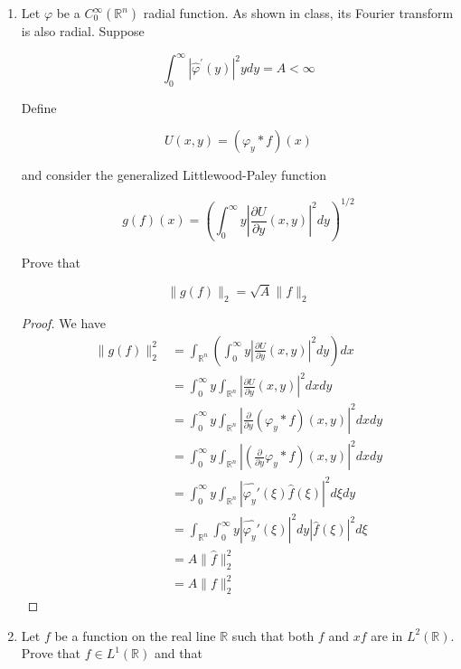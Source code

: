 \begin{enumerate}
\begin{proof}
	where
	\begin{align*}
		\int_0^{\infty} y \hat{P}_{2y} (\xi) d y
		&= \int_0^{\infty} y e^{-2 \pi (2 y) |\xi|} dy \\
		&= \frac{1}{16 \pi^2 |\xi|^2}
	\end{align*}
\end{proof}

\item Let $\varphi$ be a $C_0^{\infty}\left(\mathbb{R}^n\right)$ radial function. As shown in class, its Fourier transform is also radial. Suppose

\[
\int_0^{\infty}\left|\hat{\varphi}^{\prime}(y)\right|^2 y d y=A<\infty
\]


Define

\[
U(x, y)=\left(\varphi_y * f\right)(x)
\]

and consider the generalized Littlewood-Paley function

\[
g(f)(x)=\left(\int_0^{\infty} y\left|\frac{\partial U}{\partial y}(x, y)\right|^2 d y\right)^{1 / 2}
\]


Prove that

\[
\|g(f)\|_2=\sqrt{A}\|f\|_2
\]

\begin{proof}
	We have
	\begin{align*}
		\|g(f)\|_2^2
		&= \int _{\mathbb{R}^n} \left( \int _0^\infty y \left| \frac{\partial U}{\partial y} (x, y) \right| ^2 dy \right) dx \\
		&= \int_0 ^\infty y \int _{\mathbb{R}^n} \left| \frac{\partial U}{\partial y} (x, y) \right| ^2 dx dy \\
		&= \int _0^\infty y \int _{\mathbb{R}^n} \left| \frac{\partial}{\partial y} \left( \varphi_y * f \right) (x, y) \right| ^2 dx dy \\
		&= \int _0^\infty y \int _{\mathbb{R}^n} \left| \left( \frac{\partial}{\partial y} \varphi_y * f \right) (x, y) \right| ^2 dx dy \\
		&= \int _0^\infty y \int _{\mathbb{R}^n} \left| \widehat{\varphi_y'}(\xi) \hat{f}(\xi) \right| ^2 d \xi dy \\
		&= \int _{\mathbb{R}^n} \int _0^\infty y \left| \widehat{\varphi_y'}(\xi) \right| ^2 d y \left| \hat{f}(\xi) \right| ^2 d \xi \\	
		&= A \| \hat{f} \|_2^2 \\
		&= A \| f \|_2^2
	\end{align*}
\end{proof}

\item Let $f$ be a function on the real line $\mathbb{R}$ such that both $f$ and $x f$ are in $L^2(\mathbb{R})$. Prove that $f \in L^1(\mathbb{R})$ and that


\end{enumerate}
